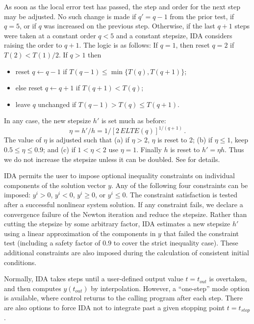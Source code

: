As soon as the local error test has passed, the step and order for the
next step may be adjusted.  No such change is made if $q' = q-1$ from
the prior test, if $q = 5$, or if $q$ was increased on the previous
step.  Otherwise, if the last $q+1$ steps were taken at a constant
order $q < 5$ and a constant stepsize, IDA considers raising the order
to $q+1$.  The logic is as follows: If $q = 1$, then reset $q = 2$ if
$T(2) < T(1)/2$.  If $q > 1$ then 
\begin{itemize}
\item reset $q \leftarrow q-1$ if $T(q-1) \leq \min\{T(q),T(q+1)\}$;
\item else reset $q \leftarrow q+1$ if $T(q+1) < T(q)$;
\item leave $q$ unchanged if $T(q-1) > T(q) \leq T(q+1)$.
\end{itemize}
In any case, the new stepsize $h'$ is set much as before:
\[ \eta = h'/h = 1/[2 \, ELTE(q)]^{1/(q+1)} \, . \]
The value of $\eta$ is adjusted such that (a) if $\eta > 2$, $\eta$ is
reset to 2; (b) if $\eta \leq 1$, keep $0.5 \leq \eta \leq 0.9$; and
(c) if $1 < \eta < 2$ use $\eta = 1$.  Finally $h$ is reset to
$h' = \eta h$.  Thus we do not increase the stepsize unless it can
be doubled.  See \cite{BCP:96} for details.  

IDA permits the user to impose optional inequality constraints on individual 
components of the solution vector $y$. Any of the following four constraints 
can be imposed: $y^i > 0$, $y^i < 0$, $y^i \geq 0$, or $y^i \leq 0$. 
The constraint satisfaction is tested after a successful nonlinear system solution. 
If any constraint fails, we declare a convergence failure of the Newton iteration 
and reduce the stepsize. Rather than cutting the stepsize by some arbitrary factor, 
IDA estimates a new stepsize $h'$ using a linear approximation of the components 
in $y$ that failed the constraint test (including a safety factor of $0.9$ to 
cover the strict inequality case). These additional constraints are also imposed
during the calculation of consistent initial conditions.

Normally, IDA takes steps until a user-defined output value $t = t_{out}$
is overtaken, and then computes $y(t_{out})$ by interpolation.  However,
a ``one-step'' mode option is available, where control returns to the
calling program after each step.  There are also options to force IDA
not to integrate past a given stopping point $t = t_{stop}$.

